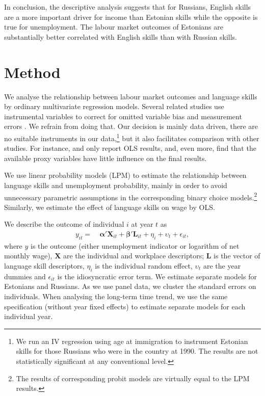 \documentclass[12pt, a4paper]{article}
\renewcommand*{\vec}[1]{\boldsymbol{#1}}
\begin{document}
In conclusion, the descriptive analysis suggests that for Russians,
English skills are a more important driver for income than Estonian
skills while the opposite is true for unemployment.  The labour market
outcomes of Estonians are substantially better correlated with English
skills than with Russian skills.



\section{Method}
\label{sec:method}

We analyse the relationship between labour market outcomes and language
skills by ordinary multivariate regression models.
Several related studies use instrumental variables to correct for
omitted variable bias and measurement errors \citep{Chiswick1995, bleakley+chin2004}.
We refrain from doing that. Our decision is mainly data driven,
there are no suitable instruments in our data,\footnote{We run an IV
	regression using age at immigration to instrument Estonian skills
	for those Russians who were in the country at 1990.  The results are
	not statistically significant at any conventional level.} but it also facilitates
comparison with other studies.  For instance,
\citet{azam+2013EDandCC} and \citet{paolo+tansel2015JofDevStud} only
report OLS results, and, even more, find that the available proxy
variables have little influence on the final results.

We use linear probability models (LPM) to estimate the relationship between
language skills and unemployment probability, mainly in order to avoid unnecessary parametric
assumptions in the corresponding binary choice models.\footnote{The
	results of corresponding probit models are virtually equal to the LPM results.}
Similarly, we estimate the effect of language skills on wage by
OLS. 

We describe the outcome of individual $i$ at year $t$ as
\begin{equation}
	\label{eq:specification}
	\begin{split}
		y_{it} = &\: \vec{\alpha}{}' \vec{X}_{it} + \vec{\beta}{}' \vec{L}_{it} +
		\eta_{i} +
		\upsilon_{t} + \epsilon_{it},
	\end{split}
\end{equation}
where $y$ is the outcome (either unemployment indicator
or logarithm of net monthly wage), $\vec{X}$ are the individual and
workplace descriptors; $\vec{L}$ is the vector of
language skill descriptors, $\eta_{i}$ is the individual random effect, $\upsilon_{t}$ are the year dummies and $\epsilon_{it}$
is the idiosyncratic error term.  We estimate separate models for
Estonians and Russians.
As we use panel data, we cluster the
standard errors on individuals.  When analysing the long-term time
trend, we use the same specification (without year fixed effects) to
estimate separate models for each individual year.
\end{document}

